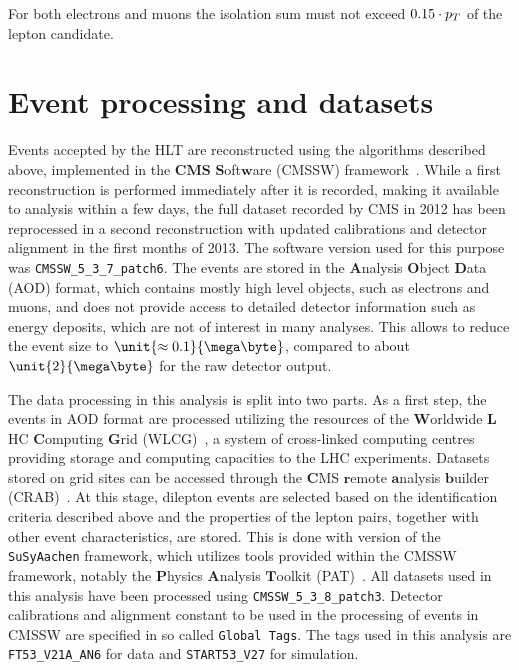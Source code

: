 For both electrons and muons the isolation sum must not exceed $0.15\cdot p_{T}$ of the lepton candidate. 


\section{Event processing and datasets}
Events accepted by the HLT are reconstructed using the algorithms described above, implemented in the $\textbf{CMS}$ $\textbf{S}$oft$\textbf{w}$are (CMSSW) framework~\cite{PTDR1,SWGuideCMSSW}. While a first reconstruction is performed immediately after it is recorded, making it available to analysis within a few days, the full dataset recorded by CMS in 2012 has been reprocessed in a second reconstruction with updated calibrations and detector alignment in the first months of 2013. The software version used for this purpose was \verb+CMSSW_5_3_7_patch6+. The events are stored in the $\textbf{A}$nalysis $\textbf{O}$bject $\textbf{D}$ata (AOD) format, which contains mostly high level objects, such as electrons and muons, and does not provide access to detailed detector information such as energy deposits, which are not of interest in many analyses. This allows to reduce the event size to $\unit{\approx0.1}{\mega\byte}$, compared to about $\unit{2}{\mega\byte}$ for the raw detector output. 

The data processing in this analysis is split into two parts. As a first step, the events in AOD format are processed utilizing the resources of the $\textbf{W}$orldwide $\textbf{L}$HC $\textbf{C}$omputing $\textbf{G}$rid (WLCG)~\cite{doi:10.1146/annurev-nucl-102010-130059,WLCG}, a system of cross-linked computing centres providing storage and computing capacities to the LHC experiments.  Datasets stored on grid sites can be accessed through the $\textbf{C}$MS $\textbf{r}$emote $\textbf{a}$nalysis $\textbf{b}$uilder (CRAB)~\cite{CRAB}. At this stage, dilepton events are selected based on the identification criteria described above and the properties of the lepton pairs, together with other event characteristics, are stored. This is done with version  of the \verb+SuSyAachen+ framework, which utilizes tools provided within the CMSSW framework, notably the $\textbf{P}$hysics $\textbf{A}$nalysis $\textbf{T}$oolkit (PAT)~\cite{PATNote}. All datasets used in this analysis have been processed using \verb+CMSSW_5_3_8_patch3+. Detector calibrations and alignment constant to be used in the processing of events in CMSSW are specified in so called \verb+Global Tags+. The tags used in this analysis are \verb+FT53_V21A_AN6+ for data and \verb+START53_V27+ for simulation.

